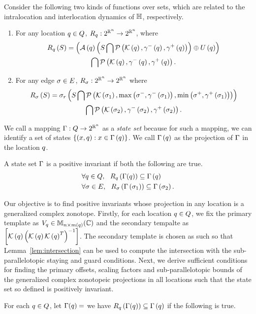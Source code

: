 Consider the following two kinds of functions over sets, which are related to the intralocation and interlocation dynamics of $\mathbb{H}$, respectively.
\begin{enumerate}
\item For any location $q\in Q$, $R_{q}:2^{\mathbb{R}^n}\rightarrow 2^{\mathbb{R}^n}$, where 
\begin{multline*}
R_{q}\left(S\right) = \left(\mathcal{A}\left(q\right)\left(S\bigcap\mathcal{P}\left(\mathcal{K}\left(q\right),\gamma^-\left(q\right),\gamma^+\left(q\right)\right)\right)\oplus U\left(q\right)\right)\\  \bigcap \mathcal{P}\left(\mathcal{K}\left(q\right),\gamma^-\left(q\right),\gamma^+\left(q\right)\right).
\end{multline*}
\item For any edge $\sigma\in E$, $R_{\sigma}:2^{\mathbb{R}^n}\rightarrow 2^{\mathbb{R}^n}$ where
\begin{multline*}
R_{\sigma}\left(S\right) =  \sigma_r\left(S\bigcap \mathcal{P}\left(\mathcal{K}\left(\sigma_{1}\right),\max\left(\sigma^-,\gamma^-\left(\sigma_{1}\right)\right),\min\left(\sigma^+,\gamma^+\left(\sigma_{1}\right) \right)\right)\right) \\ \bigcap\mathcal{P}\left(\mathcal{K}\left(\sigma_{2}\right),\gamma^-\left(\sigma_{2}\right),\gamma^+\left(\sigma_{2}\right)\right).
\end{multline*}
\end{enumerate}

We call a mapping $\Gamma:Q\rightarrow 2^{\mathbb{R}^n}$ as
 a \emph{state set} because for such a mapping, we can identify a set
 of states $\left\{\left(x,q\right):x\in\Gamma\left(q\right)\right\}$.  We
 call $\Gamma\left(q\right)$ as
 the projection of $\Gamma$ in the location $q$.

\begin{definition}
A state set $\Gamma$ is a positive invariant if
both the following are true.
\begin{align}
& \forall q\in Q,~~R_{q}\left(\Gamma(q)\right) \subseteq \Gamma\left(q\right)\\
& \forall\sigma\in E,~~R_{\sigma}\left(\Gamma\left(\sigma_{1}\right)\right) \subseteq
  \Gamma\left(\sigma_{2}\right).
\end{align}
\end{definition}


Our objective is to find positive invariants whose projection in any
location is a generalized complex zonotope.  Firstly, for each
location $q\in Q$, we fix the primary template as
$V_q\in\mathbb{M}_{n\times m(q)}(\mathbb{\mathbb{C}})$ and the secondary tempalte as
$\left[\mathcal{K}\left(q\right)\left(\mathcal{K}\left(q\right)\mathcal{K}\left(q\right)^T\right)^{-1}\right]$.  The secondary template
is chosen as such so that Lemma~\ref{lem:intersection} can be used to
compute the intersection with the sub-parallelotopic staying and guard
conditions.  Next, we derive sufficient conditions for finding the
primary offsets, scaling factors and sub-parallelotopic bounds of the
generalized complex zonotopeic projections in all locations such that
the state set so defined is positively invariant.

\begin{lemma}
For each $q\in Q$, let $\Gamma(q) = $
we have
$R_{q}\left(\Gamma(q)\right) \subseteq
\Gamma\left(q\right)$ if the following is true.

\end{lemma}
